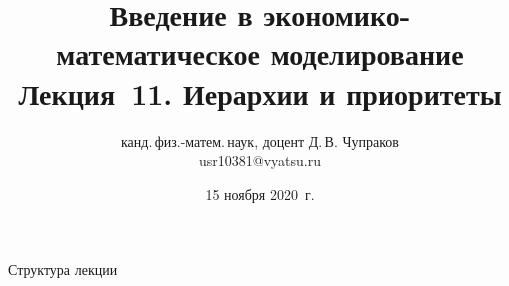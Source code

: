 \documentclass[unicode,11pt,notheorems,xcolor=table]{beamer}
\author[Д.\,В. Чупраков]{канд.\,физ.-матем.\,наук, доцент Д.\,В. Чупраков\\[6pt] usr10381@vyatsu.ru}
\institute[ВятГУ]{ФГБОУ ВО Вятский государственный университет}
\title[Лекция~11. Иерархии и приоритеты]{
	Введение в экономико-математическое моделирование\\[12pt]
	Лекция~11. Иерархии и приоритеты}
\date{15 ноября 2020~г.}
\begin{document}
\maketitle

\begin{frame}{Структура лекции}
	\tableofcontents
\end{frame}
\end{document}
